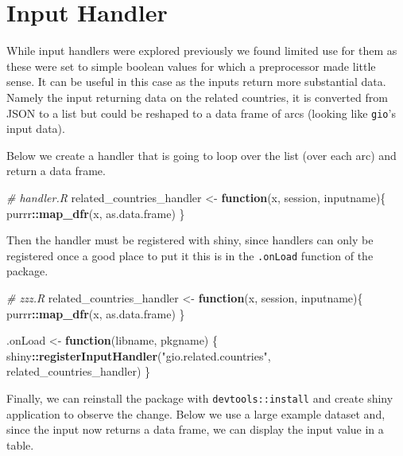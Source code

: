 \documentclass[
]{krantz}
\makeatletter
\newenvironment{Shaded}{\begin{snugshade}}{\end{snugshade}}
\newcommand{\CommentTok}[1]{\textcolor[rgb]{0.37,0.37,0.37}{\textit{#1}}}
\newcommand{\ControlFlowTok}[1]{\textcolor[rgb]{0.27,0.27,0.27}{\textbf{#1}}}
\newcommand{\KeywordTok}[1]{\textcolor[rgb]{0.27,0.27,0.27}{\textbf{#1}}}
\newcommand{\NormalTok}[1]{#1}
\newcommand{\OperatorTok}[1]{\textcolor[rgb]{0.43,0.43,0.43}{\textbf{#1}}}
\newcommand{\StringTok}[1]{\textcolor[rgb]{0.5,0.5,0.5}{#1}}
\newenvironment{kframe}{%
\medskip{}
\setlength{\fboxsep}{.8em}
 \def\at@end@of@kframe{}%
 \ifinner\ifhmode%
  \def\at@end@of@kframe{\end{minipage}}%
  \begin{minipage}{\columnwidth}%
 \fi\fi%
 \def\FrameCommand##1{\hskip\@totalleftmargin \hskip-\fboxsep
 \colorbox{shadecolor}{##1}\hskip-\fboxsep
     \hskip-\linewidth \hskip-\@totalleftmargin \hskip\columnwidth}%
 \MakeFramed {\advance\hsize-\width
   \@totalleftmargin\z@ \linewidth\hsize
   \@setminipage}}%
 {\par\unskip\endMakeFramed%
 \at@end@of@kframe}
\renewenvironment{Shaded}{\begin{kframe}}{\end{kframe}}
\makeatother
\begin{document}
\hypertarget{input-handler-1}{%
\section*{Input Handler}\label{input-handler-1}}


While input handlers were explored previously we found limited use for them as these were set to simple boolean values for which a preprocessor made little sense. It can be useful in this case as the inputs return more substantial data. Namely the input returning data on the related countries, it is converted from JSON to a list but could be reshaped to a data frame of arcs (looking like \texttt{gio}'s input data).

Below we create a handler that is going to loop over the list (over each arc) and return a data frame.

\begin{Shaded}
\begin{Highlighting}[]
\CommentTok{\# handler.R}
\NormalTok{related\_countries\_handler \textless{}{-}}\StringTok{ }\ControlFlowTok{function}\NormalTok{(x, session, inputname)\{}
\NormalTok{  purrr}\OperatorTok{::}\KeywordTok{map\_dfr}\NormalTok{(x, as.data.frame)}
\NormalTok{\}}
\end{Highlighting}
\end{Shaded}

Then the handler must be registered with shiny, since handlers can only be registered once a good place to put it this is in the \texttt{.onLoad} function of the package.

\begin{Shaded}
\begin{Highlighting}[]
\CommentTok{\# zzz.R}
\NormalTok{related\_countries\_handler \textless{}{-}}\StringTok{ }\ControlFlowTok{function}\NormalTok{(x, session, inputname)\{}
\NormalTok{  purrr}\OperatorTok{::}\KeywordTok{map\_dfr}\NormalTok{(x, as.data.frame)}
\NormalTok{\}}

\NormalTok{.onLoad \textless{}{-}}\StringTok{ }\ControlFlowTok{function}\NormalTok{(libname, pkgname) \{}
\NormalTok{  shiny}\OperatorTok{::}\KeywordTok{registerInputHandler}\NormalTok{(}\StringTok{"gio.related.countries"}\NormalTok{, related\_countries\_handler)}
\NormalTok{\}}
\end{Highlighting}
\end{Shaded}

Finally, we can reinstall the package with \texttt{devtools::install} and create shiny application to observe the change. Below we use a large example dataset and, since the input now returns a data frame, we can display the input value in a table.
\end{document}
